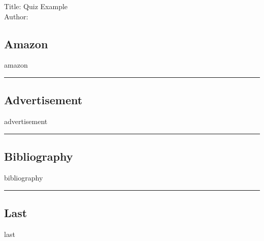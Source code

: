 
Title: Quiz Example\\
Author:

\subsection{Amazon}\label{amazon}

amazon

\begin{center}\rule{0.5\linewidth}{0.5pt}\end{center}

\subsection{Advertisement}\label{advertisement}

advertisement

\begin{center}\rule{0.5\linewidth}{0.5pt}\end{center}

\subsection{Bibliography}\label{bibliography}

bibliography

\begin{center}\rule{0.5\linewidth}{0.5pt}\end{center}

\subsection{Last}\label{last}

last

